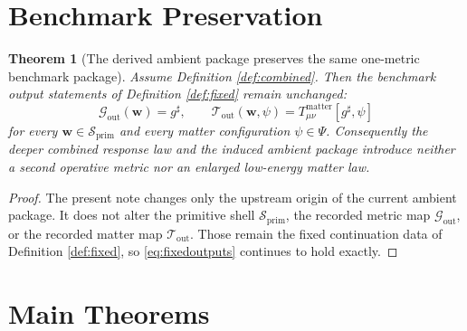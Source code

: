 \documentclass[11pt]{article}
\newcommand{\CompletedMetric}{g^{\sharp}}
\newcommand{\PrimShell}{\mathcal S_{\mathrm{prim}}}
\newcommand{\MetricOut}{\mathscr G_{\mathrm{out}}}
\newcommand{\MatterOut}{\mathscr T_{\mathrm{out}}}
\newtheorem{theorem}{Theorem}
\begin{document}
\section{Benchmark Preservation}

\begin{theorem}[The derived ambient package preserves the same one-metric benchmark package]
\label{thm:outputs}
Assume Definition \ref{def:combined}. Then the benchmark output statements of Definition \ref{def:fixed} remain unchanged:
\[
\MetricOut(\mathbf w)=\CompletedMetric,
\qquad
\MatterOut(\mathbf w,\psi)
=
T_{\mu\nu}^{\mathrm{matter}}[\CompletedMetric,\psi]
\]
for every \(\mathbf w\in\PrimShell\) and every matter configuration \(\psi\in\Psi\). Consequently the deeper combined response law and the induced ambient package introduce neither a second operative metric nor an enlarged low-energy matter law.
\end{theorem}

\begin{proof}
The present note changes only the upstream origin of the current ambient package. It does not alter the primitive shell \(\PrimShell\), the recorded metric map \(\MetricOut\), or the recorded matter map \(\MatterOut\). Those remain the fixed continuation data of Definition \ref{def:fixed}, so \eqref{eq:fixedoutputs} continues to hold exactly.
\end{proof}

\section{Main Theorems}
\end{document}
